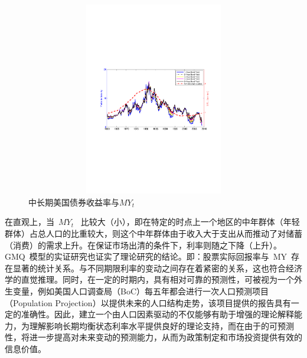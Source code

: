     \begin{figure}[!h]
    \includegraphics[width=15cm,height=8.5cm]{figures/fig01}
     \caption{中长期美国债券收益率与$MY_t$}    \label{fig01}
  \end{figure}

在直观上，当~$MY_t$~ 比较大（小），即在特定的时点上一个地区的中年群体（年轻群体）占总人口的比重较大，则这个中年群体由于收入大于支出从而推动了对储蓄（消费）的需求上升。在保证市场出清的条件下，利率则随之下降（上升）。GMQ~模型的实证研究也证实了理论研究的结论。即：股票实际回报率与~MY~存在显著的统计关系。\dsf 与不同期限利率的变动之间存在着紧密的关系，这也符合经济学的直觉推理。同时，在一定的时期内，\ds 具有相对可靠的预测性，可被视为一个外生变量，例如美国人口调查局（BoC）每五年都会进行一次人口预测项目（Population Projection）以提供未来的人口结构走势，该项目提供的报告具有一定的准确性。因此，建立一个由人口因素驱动的\tsm 不仅能够有助于增强\tsm 的理论解释能力，为理解影响长期均衡状态利率水平提供良好的理论支持，而在由于\dsf 的可预测性，将进一步提高对未来\tsm 变动的预测能力，从而为政策制定和市场投资提供有效的信息价值。


